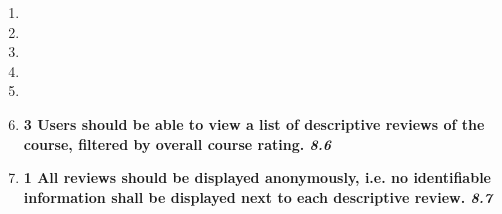\documentclass[12pt,titlepage]{article}
\newenvironment{storyPoint}
   {\color{blue} \bfseries}
   {}
\newenvironment{storyId}
   {\color{Bittersweet} \itshape}
   {}
\begin{document}
\newcommand{\storyEightPointSix}{
   \begin{storyPoint}3\end{storyPoint}
   Users should be able to view a list of descriptive reviews of the course,
   filtered by overall course rating.
   \begin{storyId}8.6\end{storyId}
}
\newcommand{\storyEightPointSeven}{
   \begin{storyPoint}1\end{storyPoint}
   All reviews should be displayed anonymously, i.e. no identifiable information
   shall be displayed next to each descriptive review.
   \begin{storyId}8.7\end{storyId}
}

\begin{enumerate}
   \item \storyEightPointOne{}
   \item \storyEightPointTwo{}
   \item \storyEightPointThree{}
   \item \storyEightPointFour{}
   \item \storyEightPointFive{}
   \item \storyEightPointSix{}
   \item \storyEightPointSeven{}
\end{enumerate}

\subsection{\epicNine{}}
\end{document}
